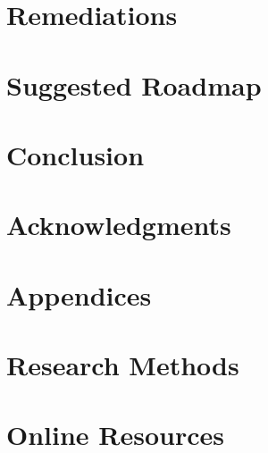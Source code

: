 \documentclass[sigconf]{acmart}
\begin{document}
\section{Remediations}
	\lipsum[2-3]

\section{Suggested Roadmap}
	\lipsum[2-3]
	
\section{Conclusion}
	\lipsum[2-2]

\section{Acknowledgments}
	\lipsum[2-2]\cite{Abril07}

	




\section*{Appendices}
\appendix

\section{Research Methods}
	\lipsum[2-2]

\section{Online Resources}
	\lipsum[2-2]
\end{document}
